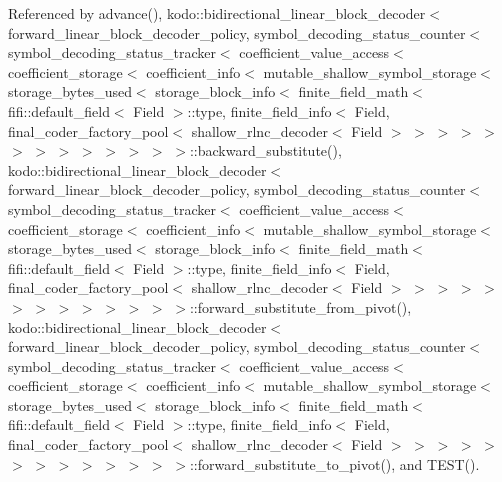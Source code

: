 Referenced by advance(), kodo\-::bidirectional\-\_\-linear\-\_\-block\-\_\-decoder$<$ forward\-\_\-linear\-\_\-block\-\_\-decoder\-\_\-policy, symbol\-\_\-decoding\-\_\-status\-\_\-counter$<$ symbol\-\_\-decoding\-\_\-status\-\_\-tracker$<$ coefficient\-\_\-value\-\_\-access$<$ coefficient\-\_\-storage$<$ coefficient\-\_\-info$<$ mutable\-\_\-shallow\-\_\-symbol\-\_\-storage$<$ storage\-\_\-bytes\-\_\-used$<$ storage\-\_\-block\-\_\-info$<$ finite\-\_\-field\-\_\-math$<$ fifi\-::default\-\_\-field$<$ Field $>$\-::type, finite\-\_\-field\-\_\-info$<$ Field, final\-\_\-coder\-\_\-factory\-\_\-pool$<$ shallow\-\_\-rlnc\-\_\-decoder$<$ Field $>$ $>$ $>$ $>$ $>$ $>$ $>$ $>$ $>$ $>$ $>$ $>$ $>$\-::backward\-\_\-substitute(), kodo\-::bidirectional\-\_\-linear\-\_\-block\-\_\-decoder$<$ forward\-\_\-linear\-\_\-block\-\_\-decoder\-\_\-policy, symbol\-\_\-decoding\-\_\-status\-\_\-counter$<$ symbol\-\_\-decoding\-\_\-status\-\_\-tracker$<$ coefficient\-\_\-value\-\_\-access$<$ coefficient\-\_\-storage$<$ coefficient\-\_\-info$<$ mutable\-\_\-shallow\-\_\-symbol\-\_\-storage$<$ storage\-\_\-bytes\-\_\-used$<$ storage\-\_\-block\-\_\-info$<$ finite\-\_\-field\-\_\-math$<$ fifi\-::default\-\_\-field$<$ Field $>$\-::type, finite\-\_\-field\-\_\-info$<$ Field, final\-\_\-coder\-\_\-factory\-\_\-pool$<$ shallow\-\_\-rlnc\-\_\-decoder$<$ Field $>$ $>$ $>$ $>$ $>$ $>$ $>$ $>$ $>$ $>$ $>$ $>$ $>$\-::forward\-\_\-substitute\-\_\-from\-\_\-pivot(), kodo\-::bidirectional\-\_\-linear\-\_\-block\-\_\-decoder$<$ forward\-\_\-linear\-\_\-block\-\_\-decoder\-\_\-policy, symbol\-\_\-decoding\-\_\-status\-\_\-counter$<$ symbol\-\_\-decoding\-\_\-status\-\_\-tracker$<$ coefficient\-\_\-value\-\_\-access$<$ coefficient\-\_\-storage$<$ coefficient\-\_\-info$<$ mutable\-\_\-shallow\-\_\-symbol\-\_\-storage$<$ storage\-\_\-bytes\-\_\-used$<$ storage\-\_\-block\-\_\-info$<$ finite\-\_\-field\-\_\-math$<$ fifi\-::default\-\_\-field$<$ Field $>$\-::type, finite\-\_\-field\-\_\-info$<$ Field, final\-\_\-coder\-\_\-factory\-\_\-pool$<$ shallow\-\_\-rlnc\-\_\-decoder$<$ Field $>$ $>$ $>$ $>$ $>$ $>$ $>$ $>$ $>$ $>$ $>$ $>$ $>$\-::forward\-\_\-substitute\-\_\-to\-\_\-pivot(), and T\-E\-S\-T().


